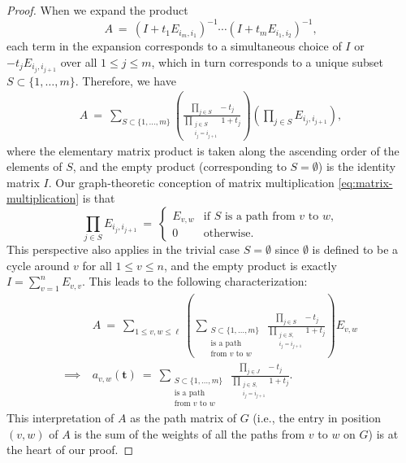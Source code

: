 \documentclass[12pt, reqno, oneside]{amsart}
\numberwithin{equation}{section}
\begin{document}
\begin{proof}
When we expand the product
\begin{equation}\label{eq:matrix-A1}
A \ = \ (I+t_1E_{i_m,i_1})^{-1}\cdots(I+t_mE_{i_1,i_2})^{-1},
\end{equation}
each term in the expansion corresponds to a simultaneous choice of $I$ or $-t_jE_{i_j, i_{j+1}}$ over all $1 \leq j \leq m$, which in turn corresponds to a unique subset $S \subset \{1, \dots, m\}$. Therefore, we have
\begin{align}
A \ = \ \sum_{S \subset \{1, \dots, m\}}\left(\frac{\prod\limits_{j\in S} \ \ \ -t_j}{\prod\limits_{\substack{j \in S \\ i_j = i_{j+1}}}1+t_j}\right)\left(\prod_{j \in S}E_{i_j,i_{j+1}}\right),
\end{align}
where the elementary matrix product is taken along the ascending order of the elements of $S$, and the empty product (corresponding to $S=\emptyset$) is the identity matrix $I$. Our graph-theoretic conception of matrix multiplication \eqref{eq:matrix-multiplication} is that \begin{equation}
\prod_{j \in S}E_{i_j,i_{j+1}} \ = \ 
\begin{cases}
E_{v,w} &\text{if } S \text{ is a path from } v \text{ to } w, \\
0 &\text{otherwise}.
\end{cases}
\end{equation}
This perspective also applies in the trivial case $S=\emptyset$ since $\emptyset$ is defined to be a cycle around $v$ for all $1 \leq v \leq n$, and the empty product is exactly $I=\sum_{v=1}^n E_{v,v}$.
This leads to the following characterization:
\begin{align}
\nonumber
& A \ = \ \sum_{1 \leq v,w \leq \ell}\left(\sum_{\substack{S\subset \{1, \dots, m\} \\ \text{is a path} \\ \text{from } v \text{ to } w}} \ \frac{\prod\limits_{j\in S} \ \ \ -t_j}{\prod\limits_{\substack{j \in S, \\ i_j = i_{j+1}}}1+t_j}\right) E_{v,w} \\
\label{eq:component-functions}
\implies \ & a_{v,w}(\mathbf{t}) \ = \ \sum_{\substack{S\subset \{1, \dots, m\} \\ \text{is a path} \\ \text{from } v \text{ to } w}} \ \frac{\prod\limits_{j\in J} \ \ \ -t_j}{\prod\limits_{\substack{j \in S, \\ i_j = i_{j+1}}}1+t_j}.
\end{align}
This interpretation of $A$ as the path matrix of $G$ (i.e., the entry in position $(v,w)$ of $A$ is the sum of the weights of all the paths from $v$ to $w$ on $G$) is at the heart of our proof. 


\end{proof}
\end{document}
